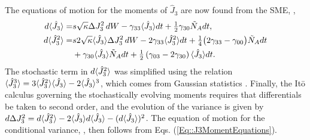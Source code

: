 \documentclass[aps,pra,twocolumn]{revtex4-1} %
\newcommand{\varz}{\Delta J_3^2}
\newcommand{\jz}{\hat{J}_3}
\newcommand{\NA}{\tilde{N}_A}
\begin{document}
\begin{appendix}
The equations of motion for the moments of $\jz$ are now found from the SME, ,
	\begin{subequations} \label{Eq::J3MomentEquations}
	\begin{align} 
		d \expt{\jz} =& s \sqrt{\kappa} \varz \, dW - \gamma_{33} \expt{\jz}dt + \smallfrac{1}{2} \gamma_{30} \NA dt ,  \\
		d \expt{\jz^2} =& s 2\sqrt{\kappa} \expt{\jz}\Delta J_3^2 \, dW - 2 \gamma_{33} \expt{\jz^2}dt + \smallfrac{1}{4} \big( 2 \gamma_{33}-\gamma_{00}\big) \NA dt \\
		&+ \gamma_{30} \expt{\jz} \NA dt + \smallfrac{1}{2}\left(\gamma_{03} -2 \gamma_{30}\right) \expt{\jz} dt. \nonumber 
	\end{align}
	\end{subequations}
The stochastic term in $d\expt{\jz^2}$ was simplified using the relation $\expt{\jz^3} = 3\expt{\jz^2}\expt{\jz}- 2\expt{\jz}^3$, which comes from Gaussian statistics \cite{jacobs_straightforward_2006}. 
Finally, the It\={o} calculus governing the stochastically evolving moments requires that differentials be taken to second order, and the evolution of the variance is given by $d \varz = d \expt{\jz^2} - 2 \expt{\jz} d \expt{\jz} - ( d \expt{\jz} )^2$. 
The equation of motion for the conditional variance, , then follows from Eqs. (\ref{Eq::J3MomentEquations}).

\end{appendix}
\end{document}
